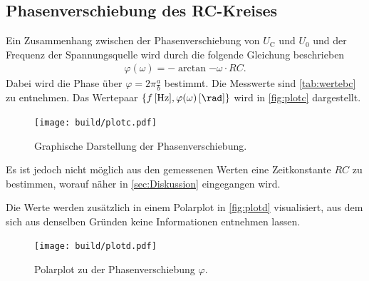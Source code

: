 \subsection{Phasenverschiebung des RC-Kreises}
Ein Zusammenhang zwischen der Phasenverschiebung von $U_{\text{C}}$ und $U_0$ und der Frequenz der Spannungsquelle wird durch
die folgende Gleichung beschrieben
\begin{align}
    \varphi(\omega) = -\arctan{-\omega\cdot RC}.
    \label{eqn:phasev}
\end{align}
Dabei wird die Phase über $\varphi = 2\pi\frac ab$ bestimmt. Die Messwerte sind \autoref{tab:wertebc} zu entnehmen.
Das Wertepaar $\{f\,[\si{\hertz}], \varphi(\omega)\, [\si{\rad}]\}$ wird in \autoref{fig:plotc} dargestellt.
\begin{figure}[H]
    \centering
    \texttt{[image: build/plotc.pdf]}
    \caption{Graphische Darstellung der Phasenverschiebung.}
    \label{fig:plotc}
\end{figure}
Es ist jedoch nicht möglich aus den gemessenen Werten eine Zeitkonstante $RC$ zu bestimmen, worauf näher in \autoref{sec:Diskussion}
eingegangen wird.

Die Werte werden zusätzlich in einem Polarplot in \autoref{fig:plotd} visualisiert, aus dem sich aus denselben Gründen 
keine Informationen entnehmen lassen.
\begin{figure}[H]
    \centering
    \texttt{[image: build/plotd.pdf]}
    \caption{Polarplot zu der Phasenverschiebung $\varphi$.}
    \label{fig:plotd}
\end{figure}

